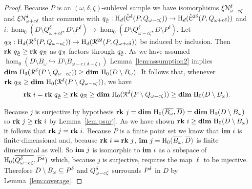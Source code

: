 \begin{proof}

  Because $P$ is an $(\omega, \delta, \zeta)$-sublevel sample we have isomorphisms $\xi\mathcal{N}_{\omega-c\zeta}^\delta$ and $\xi\mathcal{N}_{\omega+c\delta}^\delta$ that commute with $q_{\check{\mathcal{C}}} : \mathrm{H}_d(\check{\mathcal{C}}^{\delta}(P, Q_{\omega-c\zeta}))\to\mathrm{H}_d(\check{\mathcal{C}}^{2\delta}(P, Q_{\omega+c\delta}))$ and $i : \hom_0(D\setminus Q_{\omega+c\delta}^\delta, D\setminus P^\delta)\to \hom_0(D\setminus Q_{\omega-c\zeta}^\delta, D\setminus P^\delta)$.
  Let $q_{\mathcal{R}} : \mathrm{H}_d(\mathcal{R}^{\delta}(P, Q_{\omega-c\zeta}))\to\mathrm{H}_d(\mathcal{R}^{2\delta}(P, Q_{\omega+c\delta}))$ be induced by inclusion.
  Then $\mathbf{rk}~q_{\check{\mathcal{C}}} \geq\mathbf{rk}~q_{\mathcal{R}}$ as $q_{\mathcal{R}}$ factors through $q_{\check{\mathcal{C}}}$.
  As we have assumed $\hom_0(D\setminus B_\omega\hookrightarrow D\setminus B_{\omega-c(\delta+\zeta)})$ Lemma~\ref{lem:assumption2} implies $\mathbf{dim}~\mathrm{H}_0(\mathcal{R}^\delta(P\setminus Q_{\omega-c\zeta}))\geq \mathbf{dim}~\mathrm{H}_0(D\setminus B_\omega)$.
  It follows that, whenever $\mathbf{rk}~q_{\mathcal{R}} \geq \mathbf{dim}~\mathrm{H}_0(\mathcal{R}^\delta(P\setminus Q_{\omega-c\zeta}))$, we have
  \[ \mathbf{rk}~i = \mathbf{rk}~q_{\check{\mathcal{C}}} \geq \mathbf{rk}~q_{\mathcal{R}} \geq \mathbf{dim}~\mathrm{H}_0(\mathcal{R}^\delta(P\setminus Q_{\omega-c\zeta})) \geq \mathbf{dim}~\mathrm{H}_0(D\setminus B_\omega).\]

  Because $j$ is surjective by hypothesis $\mathbf{rk}~j = \mathbf{dim}~\mathrm{H}_0(\overline{B_{\omega}},\overline{D}) = \mathbf{dim}~\mathrm{H}_0(D\setminus B_\omega)$ so $\mathbf{rk}~j\geq \mathbf{rk}~i$ by Lemma~\ref{lem:psurj}.
  As we have shown $\mathbf{rk}~i\geq \mathbf{dim}~\mathrm{H}_0(D\setminus B_\omega)$ it follows that $\mathbf{rk}~j = \mathbf{rk}~i$.
  Because $P$ is a finite point set we know that $\mathbf{im}~i$ is finite-dimensional and, because $\mathbf{rk}~i = \mathbf{rk}~j$, $\mathbf{im}~j=\mathrm{H}_0(\overline{B_{\omega}}, \overline{D})$ is finite dimensional as well.
  So $\mathbf{im}~j$ is isomorphic to $\mathbf{im}~i$ as a subspace of $\mathrm{H}_0(\overline{Q_{\omega - c\zeta}^{\delta}}, \overline{P^{\delta}})$ which, because $j$ is surjective, requires the map $\ell$ to be injective.
  Therefore $D\setminus B_\omega\subseteq P^{\delta}$ and $Q_{\omega - c\zeta}^{\delta}$ surrounds $P^{\delta}$ in $D$ by Lemma~\ref{lem:coverage}.
\end{proof}

